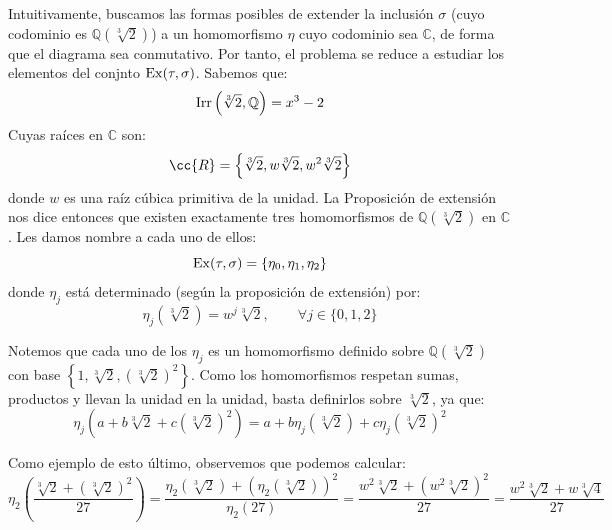 \begin{ejemplo}
    Intuitivamente, buscamos las formas posibles de extender la inclusión $\sigma$ (cuyo codominio es $\mathbb{Q}\left(\sqrt[3]{2}\right)$) a un homomorfismo $\eta$ cuyo codominio sea $\mathbb{C}$, de forma que el diagrama sea conmutativo. Por tanto, el problema se reduce a estudiar los elementos del conjnto $\operatorname{Ex}(\tau,\sigma)$. Sabemos que:
    \begin{equation*}
        \operatorname{Irr}\left(\sqrt[3]{2},\mathbb{Q}\right) = x^3-2
    \end{equation*}
    Cuyas raíces en $\mathbb{C}$ son:
    \begin{equation*}
        \cc{R} = \left\{\sqrt[3]{2}, w\sqrt[3]{2}, w^2\sqrt[3]{2}\right\}
    \end{equation*}
    donde $w$ es una raíz cúbica primitiva de la unidad. La Proposición de extensión nos dice entonces que existen exactamente tres homomorfismos de $\mathbb{Q}\left(\sqrt[3]{2}\right)$ en $\mathbb{C}$. Les damos nombre a cada uno de ellos:
    \begin{equation*}
        \operatorname{Ex}(\tau,\sigma) = \{\eta_0,\eta_1,\eta_2\}
    \end{equation*}
    donde $\eta_j$ está determinado (según la proposición de extensión) por:
    \begin{equation*}
        \eta_j\left(\sqrt[3]{2}\right) = w^j \sqrt[3]{2}, \qquad \forall j \in \{0,1,2\}
    \end{equation*}

    Notemos que cada uno de los $\eta_j$ es un homomorfismo definido sobre $\mathbb{Q}\left(\sqrt[3]{2}\right)$ con base $\left\{1,\sqrt[3]{2}, \left(\sqrt[3]{2}\right)^2\right\}$. Como los homomorfismos respetan sumas, productos y llevan la unidad en la unidad, basta definirlos sobre $\sqrt[3]{2}$, ya que:
    \begin{equation*}
        \eta_j\left(a + b\sqrt[3]{2} + c\left(\sqrt[3]{2}\right)^2\right) = a + b\eta_j\left(\sqrt[3]{2}\right) + c\eta_j\left(\sqrt[3]{2}\right)^2
    \end{equation*}



    Como ejemplo de esto último, observemos que podemos calcular:
    \begin{equation*}
        \eta_2\left(\frac{{\sqrt[3]{2}+\left(\sqrt[3]{2}\right)}^{2}}{27}\right) = \dfrac{\eta_2(\sqrt[3]{2}) + {\left(\eta_2\left(\sqrt[3]{2}\right)\right)}^{2}}{\eta_2(27)} = \dfrac{w^2 \sqrt[3]{2} + {\left(w^2\sqrt[3]{2}\right)}^{2}}{27} 
        = \dfrac{w^2 \sqrt[3]{2} + w\sqrt[3]{4}}{27} 
    \end{equation*} 
\end{ejemplo}

